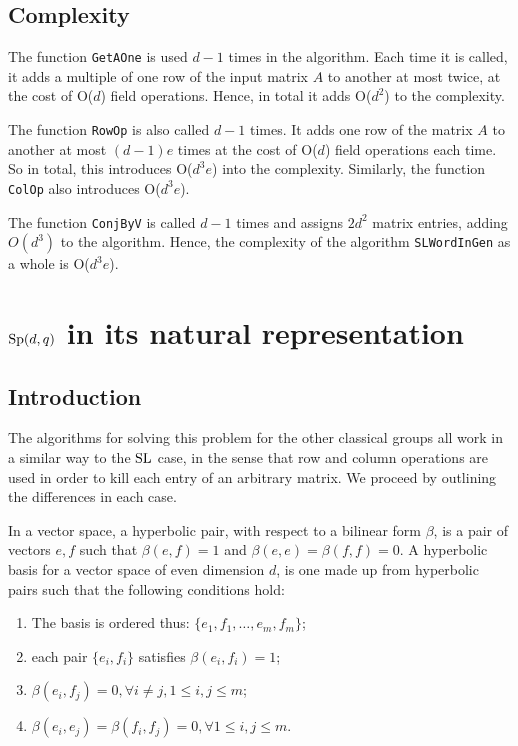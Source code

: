 \documentclass[12pt]{report}
\def\SL{{\rm SL}}
\def\Sp{{\rm Sp}}
\begin{document}
\subsection{Complexity}

The function {\tt GetAOne} is used $d-1$ times in the algorithm. Each time it is called, it adds a multiple of one row of the input matrix $A$ to another at most twice, at the cost of O($d$) field operations. Hence, in total it adds O($d^2$) to the complexity.

The function {\tt RowOp} is also called $d-1$ times. It adds one row of the matrix $A$ to another at most $(d-1)e$ times at the cost of O($d$) field operations each time. So in total, this introduces O($d^3 e$) into the complexity. Similarly, the function {\tt ColOp} also introduces O($d^3 e$).

The function {\tt ConjByV} is called $d-1$ times and assigns $2d^2$ matrix entries, adding $O(d^3)$ to the algorithm. Hence, the complexity of the algorithm {\tt SLWordInGen} as a whole is O($d^3 e$).

\section{$\Sp(d, q)$ in its natural representation}

\subsection{Introduction}

The algorithms for solving this problem for the other classical groups all work in a similar way to the $\SL$ case, in the sense that row and column operations are used in order to kill each entry of an arbitrary matrix. We proceed by outlining the differences in each case.

In a vector space, a hyperbolic pair, with respect to a bilinear form $\beta$, is a pair of vectors $e, f$ such that $\beta(e, f) = 1$ and $\beta(e, e) = \beta(f, f) = 0$. A hyperbolic basis for a vector space of even dimension $d$, is one made up from hyperbolic pairs such that the following conditions hold:

\begin{enumerate}
\item The basis is ordered thus: $\{e_1, f_1, \dots, e_m, f_m\}$;
\item each pair $\{e_i, f_i\}$ satisfies $\beta(e_i, f_i) = 1$;
\item $\beta(e_i, f_j) = 0, \forall i \ne j, 1 \le i, j \le m$;
\item $\beta(e_i, e_j) = \beta(f_i, f_j) = 0, \forall 1 \le i, j \le m$.
\end{enumerate}
\end{document}
